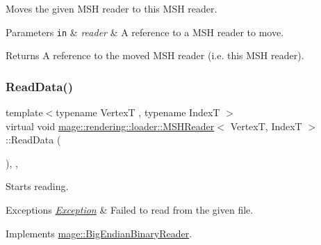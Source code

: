 Moves the given M\+SH reader to this M\+SH reader.


\begin{DoxyParams}[1]{Parameters}
\mbox{\tt in}  & {\em reader} & A reference to a M\+SH reader to move. \\
\hline
\end{DoxyParams}
\begin{DoxyReturn}{Returns}
A reference to the moved M\+SH reader (i.\+e. this M\+SH reader). 
\end{DoxyReturn}
\mbox{\label{classmage_1_1rendering_1_1loader_1_1_m_s_h_reader_a99e8e3c50decb9332dc10bcdf7b6e00a}} 
\subsubsection{\texorpdfstring{Read\+Data()}{ReadData()}}
{\footnotesize\ttfamily template$<$typename VertexT , typename IndexT $>$ \\
virtual void \mbox{\hyperlink{classmage_1_1rendering_1_1loader_1_1_m_s_h_reader}{mage\+::rendering\+::loader\+::\+M\+S\+H\+Reader}}$<$ VertexT, IndexT $>$\+::Read\+Data (\begin{DoxyParamCaption}{ }\end{DoxyParamCaption})\hspace{0.3cm}{\ttfamily [override]}, {\ttfamily [private]}, {\ttfamily [virtual]}}

Starts reading.


\begin{DoxyExceptions}{Exceptions}
{\em \mbox{\hyperlink{classmage_1_1_exception}{Exception}}} & Failed to read from the given file. \\
\hline
\end{DoxyExceptions}


Implements \mbox{\hyperlink{classmage_1_1_big_endian_binary_reader_a7dc0689d598fa91308597b129516a11d}{mage\+::\+Big\+Endian\+Binary\+Reader}}.

\mbox{\label{classmage_1_1rendering_1_1loader_1_1_m_s_h_reader_a0308b90e3cf888d383a228cfe8827972}} 
